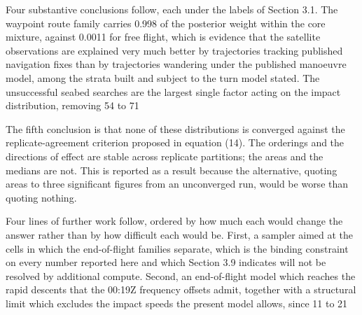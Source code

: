 \documentclass[12pt,a4paper]{article}
\begin{document}
Four substantive conclusions follow, each under the labels of Section 3.1. The waypoint route family carries 0.998 of the posterior weight within the core mixture, against 0.0011 for free flight, which is evidence that the satellite observations are explained very much better by trajectories tracking published navigation fixes than by trajectories wandering under the published manoeuvre model, among the strata built and subject to the turn model stated. The unsuccessful seabed searches are the largest single factor acting on the impact distribution, removing 54 to 71%

The fifth conclusion is that none of these distributions is converged against the replicate-agreement criterion proposed in equation (14). The orderings and the directions of effect are stable across replicate partitions; the areas and the medians are not. This is reported as a result because the alternative, quoting areas to three significant figures from an unconverged run, would be worse than quoting nothing.

Four lines of further work follow, ordered by how much each would change the answer rather than by how difficult each would be. First, a sampler aimed at the cells in which the end-of-flight families separate, which is the binding constraint on every number reported here and which Section 3.9 indicates will not be resolved by additional compute. Second, an end-of-flight model which reaches the rapid descents that the 00:19Z frequency offsets admit, together with a structural limit which excludes the impact speeds the present model allows, since 11 to 21%
\end{document}
